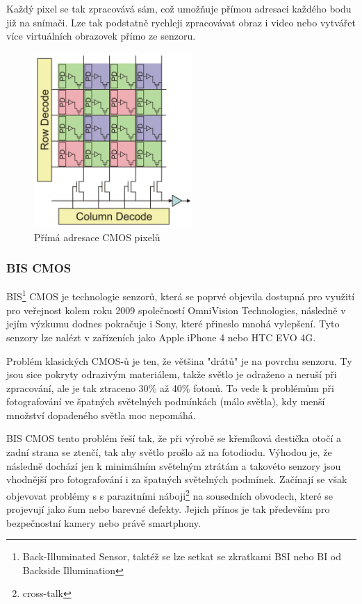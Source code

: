 \documentclass[12pt,a4paper,titlepage,final]{report}
\begin{document}
Každý pixel se tak zpracovává sám, což umožňuje přímou adresaci každého bodu již na snímači. Lze tak podstatně rychleji zpracovávat obraz i video nebo vytvářet více virtuálních obrazovek přímo ze senzoru.

\begin{figure}[ht]
\begin{center}
\includegraphics[width=6cm]{images/cmos-address.png}
\caption{Přímá adresace CMOS pixelů}
\label{fig:cmos-address}
\end{center}
\end{figure}

\subsubsection{BIS CMOS}\label{subsubsec:bis-cmos}

BIS\footnote{Back-Illuminated Sensor, taktéž se lze setkat se zkratkami BSI nebo BI od Backside Illumination} CMOS je technologie senzorů, která se poprvé objevila dostupná pro využití pro veřejnost kolem roku 2009 společností OmniVision Technologies, následně v jejím výzkumu dodnes pokračuje i Sony, které přineslo mnohá vylepšení. Tyto senzory lze nalézt v zařízeních jako Apple iPhone 4 nebo HTC EVO 4G.

Problém klasických CMOS-ů je ten, že většina "drátů" je na povrchu senzoru. Ty jsou sice pokryty odrazivým materiálem, takže světlo je odraženo a neruší při zpracování, ale je tak ztraceno 30\% až 40\% fotonů. To vede k problémům při fotografování ve špatných světelných podmínkách (málo světla), kdy menší množství dopadeného světla moc nepomáhá.

BIS CMOS tento problém řeší tak, že při výrobě se křemíková destička otočí a zadní strana se ztenčí, tak aby světlo prošlo až na fotodiodu. Výhodou je, že následně dochází jen k minimálním světelným ztrátám a takovéto senzory jsou vhodnější pro fotografování i za špatných světelných podmínek. Začínají se však objevovat problémy s s parazitními náboji\footnote{cross-talk} na sousedních obvodech, které se projevují jako šum nebo barevné defekty. Jejich přínos je tak především pro bezpečnostní kamery nebo právě smartphony.
\end{document}
